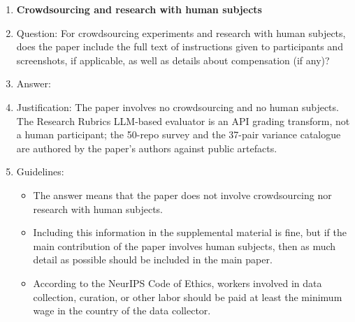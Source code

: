 \begin{enumerate}
\item {\bf Crowdsourcing and research with human subjects}
    \item[] Question: For crowdsourcing experiments and research with human subjects, does the paper include the full text of instructions given to participants and screenshots, if applicable, as well as details about compensation (if any)?
    \item[] Answer: \answerNA{}
    \item[] Justification: The paper involves no crowdsourcing and no human subjects. The Research Rubrics LLM-based evaluator is an API grading transform, not a human participant; the 50-repo survey and the 37-pair variance catalogue are authored by the paper's authors against public artefacts.
    \item[] Guidelines:
    \begin{itemize}
        \item The answer \answerNA{} means that the paper does not involve crowdsourcing nor research with human subjects.
        \item Including this information in the supplemental material is fine, but if the main contribution of the paper involves human subjects, then as much detail as possible should be included in the main paper.
        \item According to the NeurIPS Code of Ethics, workers involved in data collection, curation, or other labor should be paid at least the minimum wage in the country of the data collector.
    \end{itemize}


\end{enumerate}
